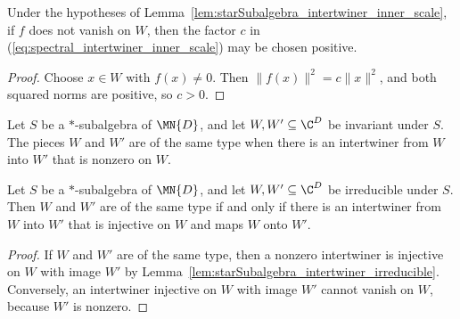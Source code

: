 \begin{lemma}%
    \label{lem:starSubalgebra_intertwiner_inner_scale_pos}
    \leanok
    Under the hypotheses of
    Lemma~\ref{lem:starSubalgebra_intertwiner_inner_scale}, if $f$ does not
    vanish on $W$, then the factor $c$ in
    (\ref{eq:spectral_intertwiner_inner_scale}) may be chosen positive.
\end{lemma}

\begin{proof}
    \leanok
    Choose $x\in W$ with $f(x)\neq0$. Then
    $\lVert f(x)\rVert^2=c\lVert x\rVert^2$, and both squared norms are
    positive, so $c>0$.
\end{proof}

\begin{definition}%
    \label{def:starSubalgebra_sameIsotype}
    \leanok
    Let $S$ be a $*$-subalgebra of $\MN{D}$, and let
    $W,W'\subseteq\C^D$ be invariant under $S$. The pieces $W$ and $W'$
    are of the same type when there is an intertwiner from $W$ into $W'$
    that is nonzero on $W$.
\end{definition}

\begin{lemma}%
    \label{lem:starSubalgebra_sameIsotype_iso}
    \leanok
    Let $S$ be a $*$-subalgebra of $\MN{D}$, and let
    $W,W'\subseteq\C^D$ be irreducible under $S$. Then $W$ and $W'$ are
    of the same type if and only if there is an intertwiner from $W$ into
    $W'$ that is injective on $W$ and maps $W$ onto $W'$.
\end{lemma}

\begin{proof}
    \leanok
    If $W$ and $W'$ are of the same type, then a nonzero intertwiner is
    injective on $W$ with image $W'$ by
    Lemma~\ref{lem:starSubalgebra_intertwiner_irreducible}. Conversely, an
    intertwiner injective on $W$ with image $W'$ cannot vanish on $W$,
    because $W'$ is nonzero.
\end{proof}

